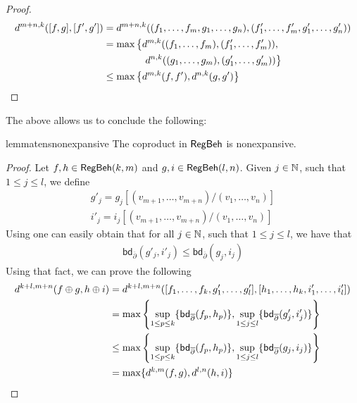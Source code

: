 \begin{proof}
	\begin{align*}
		d^{m +n, k}([ f, g ], [ f', g' ]) &= d^{m +n, k}((f_1, \dots, f_m, g_1, \dots, g_n), (f'_1, \dots, f'_m, g'_1, \dots, g'_n)) \\
		&=\max \left\{d^{m,k}((f_1, \dots, f_m), (f'_1, \dots, f'_m)),\right.\\&\qquad \qquad\left. d^{n,k}((g_1, \dots, g_m), (g'_1, \dots, g'_m)) \right\}\\
		&\leq \max \left\{d^{m,k}(f,f'),d^{n,k}(g,g') \right\}\\
	\end{align*}
\end{proof}
The above allows us to conclude the following:
\begin{restatable}{lemma}{tensnonexpansive}\label{lem:tens_nonexpansive}
	The coproduct in $\mathsf{RegBeh}$ is nonexpansive.
\end{restatable}
\begin{proof}
	Let $f,h \in \mathsf{RegBeh}(k,m)$ and $g,i \in \mathsf{RegBeh}(l,n)$. Given $j \in \mathbb{N}$, such that $1 \leq j \leq l$, we define
	\begin{gather*}
	g'_j = g_j[(v_{m + 1}, \dots, v_{m + n})/(v_1, \dots, v_n)]\\
	i'_j = i_j[(v_{m + 1}, \dots, v_{m + n})/(v_1, \dots, v_n)]
	\end{gather*}
	Using  one can easily obtain that for all $j \in \mathbb{N}$, such that $1 \leq j \leq l$, we have that
	\begin{align*}
		\mathsf{bd}_{\overline\partial} (g'_j, i'_j) \leq \mathsf{bd}_{\overline\partial} (g_j, i_j)
	\end{align*}
	Using that fact, we can prove the following
	\begin{align*}
		d^{k + l, m + n}(f \oplus g, h \oplus i) &= d^{k + l, m + n}([ f_1, \dots, f_k, g'_1, \dots, g'_l],[ h_1, \dots, h_k, i'_1, \dots, i'_l])\\
		&=\max \left\{\sup_{1 \leq p \leq k}\{\mathsf{bd}_{\overline\partial} (f_p, h_p)\}, \sup_{1 \leq j \leq l} \{\mathsf{bd}_{\overline\partial} (g'_j, i'_j)\} \right\}\\
		&\leq \max \left\{\sup_{1 \leq p \leq k}\{\mathsf{bd}_{\overline\partial} (f_p, h_p)\}, \sup_{1 \leq j \leq l} \{\mathsf{bd}_{\overline\partial} (g_j, i_j)\} \right\}\\
		&= \max \{d^{k,m}(f,g), d^{l,n}(h,i)\}
	\end{align*}
\end{proof}
